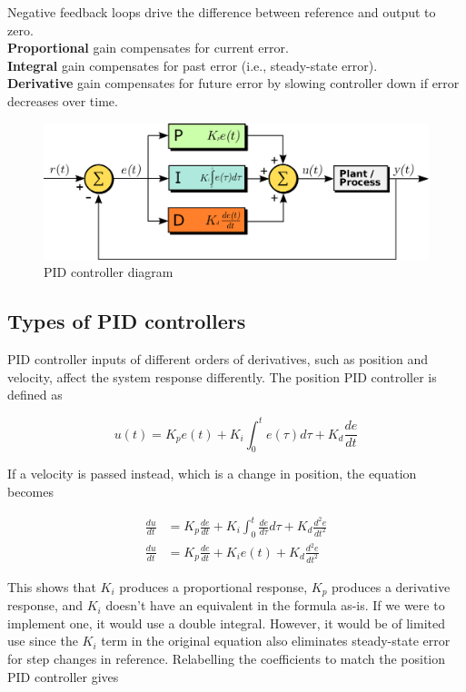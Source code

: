 \documentclass[10pt,conference,compsoc]{IEEEtran}
\begin{document}
\noindent Negative feedback loops drive the difference between \gls{reference}
and \gls{output} to zero. \\

\noindent \textbf{Proportional} gain compensates for current \gls{error}. \\
\textbf{Integral} gain compensates for past error (i.e.,
\gls{steady-state error}). \\
\textbf{Derivative} gain compensates for future error by slowing controller down
  if error decreases over time.

\begin{figure}[H]
  \includegraphics[width=\linewidth]{figs/PID_diagram.png}
  \caption{PID controller diagram \cite{bib:PID_diagram}}
\end{figure}

\subsection{Types of PID controllers}

\noindent PID controller inputs of different orders of derivatives, such as
position and velocity, affect the system response differently. The position PID
controller is defined as

\begin{equation}
  u(t) = K_p e(t) + K_i \int_0^t e(\tau) d\tau + K_d \frac{de}{dt}
\end{equation}

\noindent If a velocity is passed instead, which is a change in position, the
equation becomes

\begin{align}
  \frac{du}{dt} &= K_p \frac{de}{dt} + K_i \int_0^t \frac{de}{d\tau} d\tau +
    K_d \frac{d^2e}{dt^2} \nonumber \\
  \frac{du}{dt} &= K_p \frac{de}{dt} + K_i e(t) + K_d \frac{d^2e}{dt^2}
\end{align}

\noindent This shows that $K_i$ produces a proportional response, $K_p$ produces
a derivative response, and $K_i$ doesn't have an equivalent in the formula
as-is. If we were to implement one, it would use a double integral. However, it
would be of limited use since the $K_i$ term in the original equation also
eliminates steady-state error for step changes in reference. Relabelling the
coefficients to match the position PID controller gives
\end{document}

